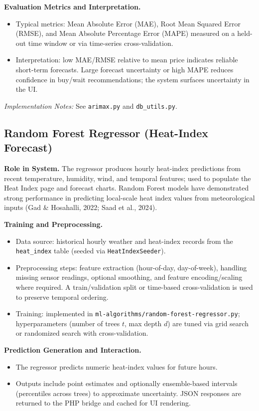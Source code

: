 \documentclass[12pt]{article}
\begin{document}
\noindent\textbf{Evaluation Metrics and Interpretation.}
\begin{itemize}
    \item Typical metrics: Mean Absolute Error (MAE), Root Mean Squared Error (RMSE), and Mean Absolute Percentage Error (MAPE) measured on a held-out time window or via time-series cross-validation.
    \item Interpretation: low MAE/RMSE relative to mean price indicates reliable short-term forecasts. Large forecast uncertainty or high MAPE reduces confidence in buy/wait recommendations; the system surfaces uncertainty in the UI.
\end{itemize}

\noindent\textit{Implementation Notes:} See \texttt{arimax.py} and \texttt{db\_utils.py}.

\subsection{Random Forest Regressor (Heat-Index Forecast)}

\noindent\textbf{Role in System.} The regressor produces hourly heat-index predictions from recent temperature, humidity, wind, and temporal features; used to populate the Heat Index page and forecast charts. Random Forest models have demonstrated strong performance in predicting local-scale heat index values from meteorological inputs (Gad \& Hosahalli, 2022; Saad et al., 2024).

\noindent\textbf{Training and Preprocessing.}
\begin{itemize}
    \item Data source: historical hourly weather and heat-index records from the \texttt{heat\_index} table (seeded via \texttt{HeatIndexSeeder}).
    \item Preprocessing steps: feature extraction (hour-of-day, day-of-week), handling missing sensor readings, optional smoothing, and feature encoding/scaling where required. A train/validation split or time-based cross-validation is used to preserve temporal ordering.
    \item Training: implemented in \texttt{ml-algorithms/random-forest-regressor.py}; hyperparameters (number of trees $t$, max depth $d$) are tuned via grid search or randomized search with cross-validation.
\end{itemize}

\noindent\textbf{Prediction Generation and Interaction.}
\begin{itemize}
    \item The regressor predicts numeric heat-index values for future hours.
    \item Outputs include point estimates and optionally ensemble-based intervals (percentiles across trees) to approximate uncertainty. JSON responses are returned to the PHP bridge and cached for UI rendering.
\end{itemize}
\end{document}
